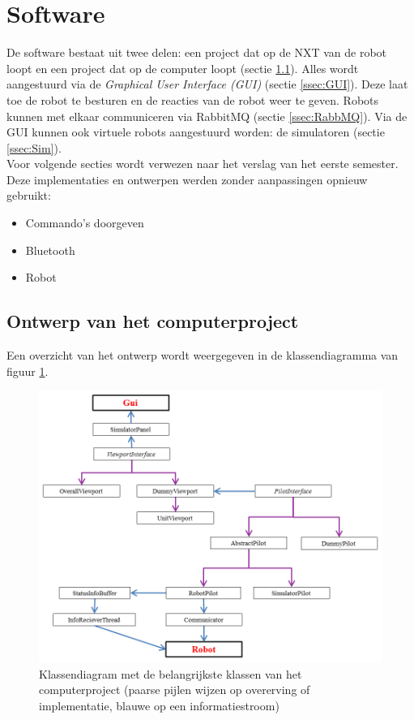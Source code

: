 \documentclass[tt2]{penoverslag}
\begin{document}
\section{Software}
\label{secc:softw}
De software bestaat uit twee delen: een project dat op de NXT van de robot loopt en een project dat op de computer loopt (sectie \ref{ssec:Sdesign}). Alles wordt aangestuurd via de \textit{Graphical User Interface (GUI)} (sectie \ref{ssec:GUI}). Deze laat toe de robot te besturen en de reacties van de robot weer te geven. Robots kunnen met elkaar communiceren via RabbitMQ (sectie \ref{ssec:RabbMQ}). Via de GUI kunnen ook virtuele robots aangestuurd worden: de simulatoren (sectie \ref{ssec:Sim}).\\

Voor volgende secties wordt verwezen naar het verslag van het eerste semester. Deze implementaties en ontwerpen werden zonder aanpassingen opnieuw gebruikt:

\begin{itemize}
\item Commando's doorgeven
\item Bluetooth
\item Robot
\end{itemize}

\subsection{Ontwerp van het computerproject}
\label{ssec:Sdesign}
Een overzicht van het ontwerp wordt weergegeven in de klassendiagramma van figuur \ref{fig:klasSoft}.\\

\begin{figure}
\centering
		\includegraphics[width=\textwidth]{KlasSoftware}
\caption[Klassendiagram computerproject]{Klassendiagram met de belangrijkste klassen van het computerproject (paarse pijlen wijzen op overerving of implementatie, blauwe op een informatiestroom)}
\label{fig:klasSoft}
\end{figure}
\end{document}
